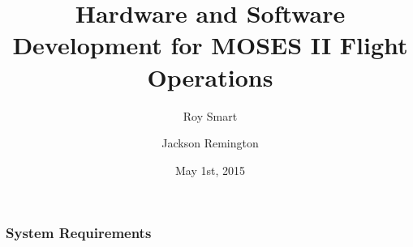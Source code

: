 \documentclass[landscape,xcolor={table}]{beamer}
\title[Crisis]{Hardware and Software Development for MOSES II Flight Operations}
\author[Smart, Mashburn]{Roy Smart \and Jackson Remington}
\institute{Montana State University}
\date{May 1st, 2015}
\begin{document}
	\frame{\titlepage}

	\begin{frame}
		
		\frametitle{System Requirements}


	\end{frame}
	
\end{document}
